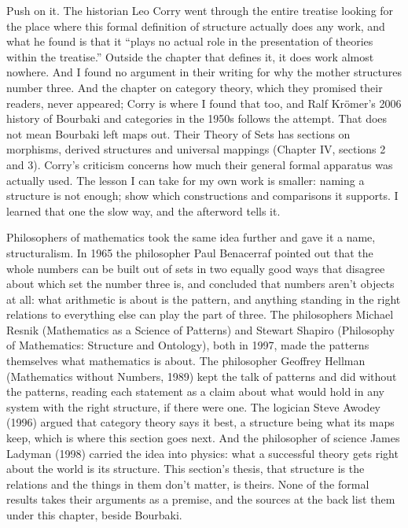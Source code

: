 \documentclass[11pt,twoside]{article}
\theoremstyle{thielethm}
\theoremstyle{thieledef}
\theoremstyle{thieledef}
\theoremstyle{thieledef}
\theoremstyle{thielethm}
\theoremstyle{thieleobs}
\theoremstyle{thielethm}
\begin{document}
Push on it. The historian Leo Corry went through the entire treatise looking for the place where this formal definition of structure actually does any work, and what he found is that it ``plays no actual role in the presentation of theories within the treatise.'' Outside the chapter that defines it, it does work almost nowhere. And I found no argument in their writing for why the mother structures number three. And the chapter on category theory, which they promised their readers, never appeared; Corry is where I found that too, and Ralf Krömer's 2006 history of Bourbaki and categories in the 1950s follows the attempt. That does not mean Bourbaki left maps out. Their Theory of Sets has sections on morphisms, derived structures and universal mappings (Chapter IV, sections 2 and 3). Corry's criticism concerns how much their general formal apparatus was actually used. The lesson I can take for my own work is smaller: naming a structure is not enough; show which constructions and comparisons it supports. I learned that one the slow way, and the afterword tells it.

Philosophers of mathematics took the same idea further and gave it a name, structuralism. In 1965 the philosopher Paul Benacerraf pointed out that the whole numbers can be built out of sets in two equally good ways that disagree about which set the number three is, and concluded that numbers aren't objects at all: what arithmetic is about is the pattern, and anything standing in the right relations to everything else can play the part of three. The philosophers Michael Resnik (Mathematics as a Science of Patterns) and Stewart Shapiro (Philosophy of Mathematics: Structure and Ontology), both in 1997, made the patterns themselves what mathematics is about. The philosopher Geoffrey Hellman (Mathematics without Numbers, 1989) kept the talk of patterns and did without the patterns, reading each statement as a claim about what would hold in any system with the right structure, if there were one. The logician Steve Awodey (1996) argued that category theory says it best, a structure being what its maps keep, which is where this section goes next. And the philosopher of science James Ladyman (1998) carried the idea into physics: what a successful theory gets right about the world is its structure. This section's thesis, that structure is the relations and the things in them don't matter, is theirs. None of the formal results takes their arguments as a premise, and the sources at the back list them under this chapter, beside Bourbaki.
\end{document}
